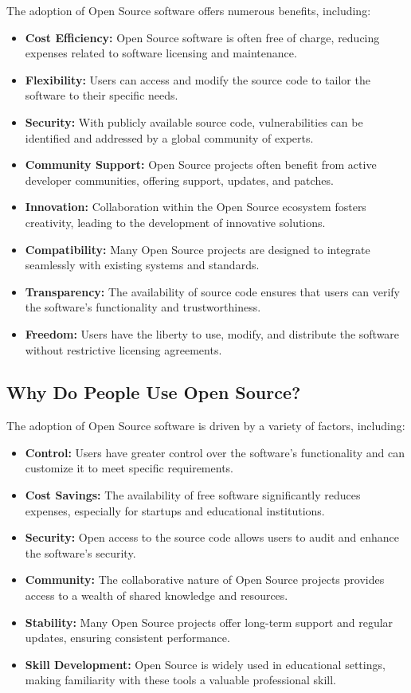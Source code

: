 The adoption of Open Source software offers numerous benefits, including:

\begin{itemize}
    \item \textbf{Cost Efficiency:} Open Source software is often free of charge, reducing expenses related to software licensing and maintenance.
    \item \textbf{Flexibility:} Users can access and modify the source code to tailor the software to their specific needs.
    \item \textbf{Security:} With publicly available source code, vulnerabilities can be identified and addressed by a global community of experts.
    \item \textbf{Community Support:} Open Source projects often benefit from active developer communities, offering support, updates, and patches.
    \item \textbf{Innovation:} Collaboration within the Open Source ecosystem fosters creativity, leading to the development of innovative solutions.
    \item \textbf{Compatibility:} Many Open Source projects are designed to integrate seamlessly with existing systems and standards.
    \item \textbf{Transparency:} The availability of source code ensures that users can verify the software's functionality and trustworthiness.
    \item \textbf{Freedom:} Users have the liberty to use, modify, and distribute the software without restrictive licensing agreements.
\end{itemize}

\subsection{Why Do People Use Open Source?}

The adoption of Open Source software is driven by a variety of factors, including:

\begin{itemize}
    \item \textbf{Control:} Users have greater control over the software's functionality and can customize it to meet specific requirements.
    \item \textbf{Cost Savings:} The availability of free software significantly reduces expenses, especially for startups and educational institutions.
    \item \textbf{Security:} Open access to the source code allows users to audit and enhance the software’s security.
    \item \textbf{Community:} The collaborative nature of Open Source projects provides access to a wealth of shared knowledge and resources.
    \item \textbf{Stability:} Many Open Source projects offer long-term support and regular updates, ensuring consistent performance.
    \item \textbf{Skill Development:} Open Source is widely used in educational settings, making familiarity with these tools a valuable professional skill.
\end{itemize}

